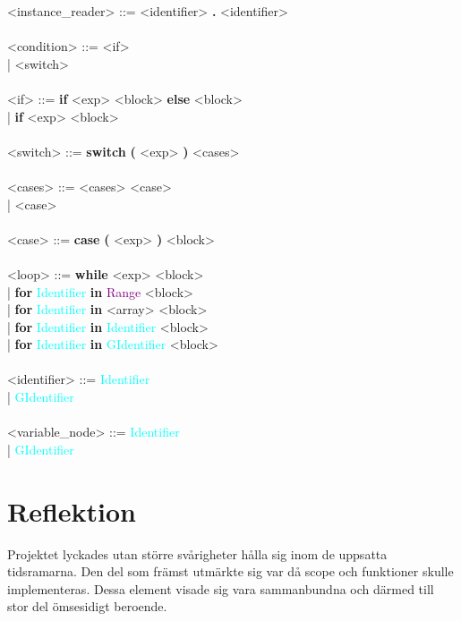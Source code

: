 \documentclass{Dokumentmall}
\begin{document}
\begin{tabbing}
  \><instance\_reader> \>::= \><identifier> \textbf{.} <identifier>\\\\

  \><condition> \>::= \><if>\\
  \> \>| \>  <switch>\\\\

  \><if> \>::= \>\textbf{if}  <exp> <block> \textbf{else} <block>\\
  \> \>| \> \textbf{if} <exp> <block>\\\\

  \><switch> \>::= \>\textbf{switch} \textbf{(} <exp> \textbf{)} <cases>\\\\

  \><cases> \>::= \><cases> <case>\\
  \> \>| \> <case>\\\\

  \><case> \>::= \>\textbf{case} \textbf{(} <exp> \textbf{)} <block>\\\\

  \><loop> \>::= \>\textbf{while} <exp> <block>\\
  \> \>| \> \textbf{for} \textcolor{Cyan}{Identifier} \textbf{in} \textcolor{Purple}{Range} <block>\\
  \> \>| \> \textbf{for} \textcolor{Cyan}{Identifier} \textbf{in} <array> <block>\\
  \> \>| \> \textbf{for} \textcolor{Cyan}{Identifier} \textbf{in} \textcolor{Cyan}{Identifier} <block>\\
  \> \>| \> \textbf{for} \textcolor{Cyan}{Identifier} \textbf{in} \textcolor{Cyan}{GIdentifier} <block>\\\\

  \><identifier> \>::= \>\textcolor{Cyan}{Identifier} \\
  \> \>| \> \textcolor{Cyan}{GIdentifier}\\\\

  \><variable\_node> \>::= \>\textcolor{Cyan}{Identifier} \\
  \> \>| \> \textcolor{Cyan}{GIdentifier}\\
\end{tabbing}
\newpage
\section{Reflektion}
Projektet lyckades utan större svårigheter hålla sig inom de uppsatta tidsramarna. Den del som främst utmärkte sig var då scope och funktioner skulle implementeras. Dessa element visade sig vara sammanbundna och därmed till stor del ömsesidigt beroende.\\
\end{document}
